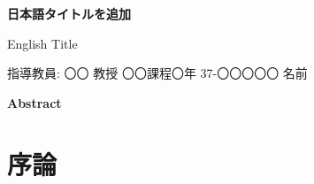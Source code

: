 \documentclass[a4paper,10.5pt,twocolumn]{bxjsarticle}
\begin{document}
\thispagestyle{fancy}

\begin{center}
  {\LARGE \bfseries 日本語タイトルを追加 \par}
  \vspace{2mm}
  {\large English Title \par}
\end{center}

\vspace{5mm}

\noindent
指導教員: 〇〇 教授
\hfill
〇〇課程〇年 37-〇〇〇〇〇 名前

\vspace{10mm}

\begin{center}
  \bfseries Abstract
\end{center}
\lipsum[1] %

\vspace{5mm}

\section{序論}
\bxjlipsum[1] %

\section{}
\bxjlipsum[2-4] %

\section{}
\bxjlipsum[5-7] %
\end{document}
